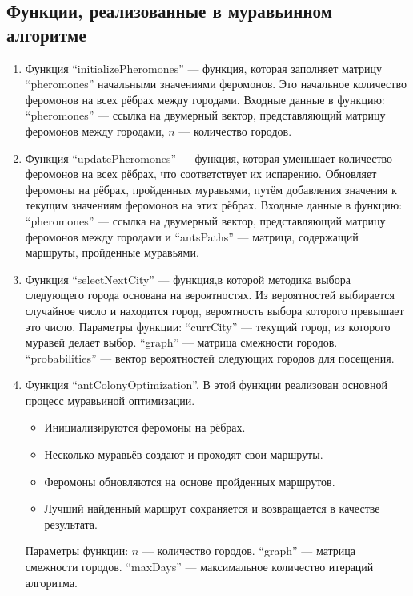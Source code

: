 \documentclass[12pt, a4paper]{article}
\begin{document}
\subsection{Функции, реализованные в муравьинном алгоритме}
\begin{enumerate}
    \item Функция ``initializePheromones'' --- функция, которая заполняет матрицу ``pheromones'' начальными значениями феромонов. Это начальное количество феромонов на всех рёбрах между городами. Входные данные в функцию: ``pheromones'' --- ссылка на двумерный вектор, представляющий матрицу феромонов между городами, $n$ --- количество городов.
    \item Функция ``updatePheromones'' --- функция, которая уменьшает количество феромонов на всех рёбрах, что соответствует их испарению. Обновляет феромоны на рёбрах, пройденных муравьями, путём добавления значения к текущим значениям феромонов на этих рёбрах. Входные данные в функцию: ``pheromones'' --- ссылка на двумерный вектор, представляющий матрицу феромонов между городами и ``antsPaths'' --- матрица, содержащий маршруты, пройденные муравьями.
    \item Функция ``selectNextCity'' --- функция,в которой методика выбора следующего города основана на вероятностях. Из вероятностей выбирается случайное число и находится город, вероятность выбора которого превышает это число. Параметры функции: ``currCity'' --- текущий город, из которого муравей делает выбор. ``graph'' --- матрица смежности городов. ``probabilities'' --- вектор вероятностей следующих городов для посещения.
    \item Функция ``antColonyOptimization''. В этой функции реализован основной процесс муравьиной оптимизации.
    \begin{itemize}
        \item[---] Инициализируются феромоны на рёбрах.
        \item[---]  Несколько муравьёв создают и проходят свои маршруты.
        \item[---]  Феромоны обновляются на основе пройденных маршрутов.
        \item[---]  Лучший найденный маршрут сохраняется и возвращается в качестве результата.
    \end{itemize}
    Параметры функции: $n$ --- количество городов. ``graph'' --- матрица смежности городов. ``maxDays'' --- максимальное количество итераций алгоритма.

\end{enumerate}
\end{document}
